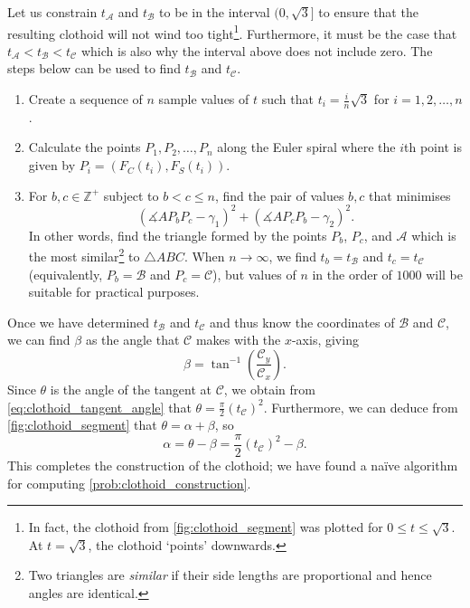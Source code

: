 Let us constrain $t_\mathcal{A}$ and $t_\mathcal{B}$ to be in the interval $(0, \sqrt{3}]$ to ensure that the resulting clothoid will not wind too tight\footnote{In fact, the clothoid from \ref{fig:clothoid_segment} was plotted for $0 \leq t \leq \sqrt{3}$. At $t=\sqrt{3}$, the clothoid `points' downwards.}.
Furthermore, it must be the case that $t_\mathcal{A}<t_\mathcal{B}<t_\mathcal{C}$ which is also why the interval above does not include zero.
The steps below can be used to find $t_\mathcal{B}$ and $t_\mathcal{C}$.
\begin{enumerate}
    \item Create a sequence of $n$ sample values of $t$ such that $t_i = \frac{i}{n}\sqrt{3}$ for $i=1,2,\dots,n$.
    \item Calculate the points $P_1,P_2,\dots,P_n$ along the Euler spiral where the $i$th point is given by $P_i = (F_C(t_i),F_S(t_i))$.
    \item For $b,c \in \mathbb{Z}^+$ subject to $b<c\leq n$, find the pair of values $b,c$ that minimises
        \begin{equation}
            \label{eq:clothoid_construction_error}
            \left(\measuredangle{AP_bP_c} - \gamma_1\right)^2 + \left(\measuredangle{AP_cP_b} - \gamma_2\right)^2.
        \end{equation}
        In other words, find the triangle formed by the points $P_b$, $P_c$, and $\mathcal{A}$ which is the most similar\footnote{Two triangles are \textit{similar} if their side lengths are proportional and hence angles are identical.} to $\triangle{ABC}$. 
        When $n\to\infty$, we find $t_b=t_\mathcal{B}$ and $t_c=t_\mathcal{C}$ (equivalently, $P_b=\mathcal{B}$ and $P_c=\mathcal{C}$), but values of $n$ in the order of $1000$ will be suitable for practical purposes.
\end{enumerate}

Once we have determined $t_\mathcal{B}$ and $t_\mathcal{C}$ and thus know the coordinates of $\mathcal{B}$ and $\mathcal{C}$, we can find $\beta$ as the angle that $\mathcal{C}$ makes with the $x$-axis, giving
\begin{equation}
    \beta = \tan^{-1} \left( \frac{\mathcal{C}_y}{\mathcal{C}_x} \right).
\end{equation}
Since $\theta$ is the angle of the tangent at $\mathcal{C}$, we obtain from \ref{eq:clothoid_tangent_angle} that $\theta=\frac{\pi}{2} \left(t_\mathcal{C}\right)^2$.
Furthermore, we can deduce from  \ref{fig:clothoid_segment} that $\theta=\alpha+\beta$, so
\begin{equation}
    \alpha = \theta - \beta = \frac{\pi}{2} \left(t_\mathcal{C}\right)^2 - \beta.
\end{equation}
This completes the construction of the clothoid; we have found a na\"{i}ve algorithm for computing \ref{prob:clothoid_construction}.



